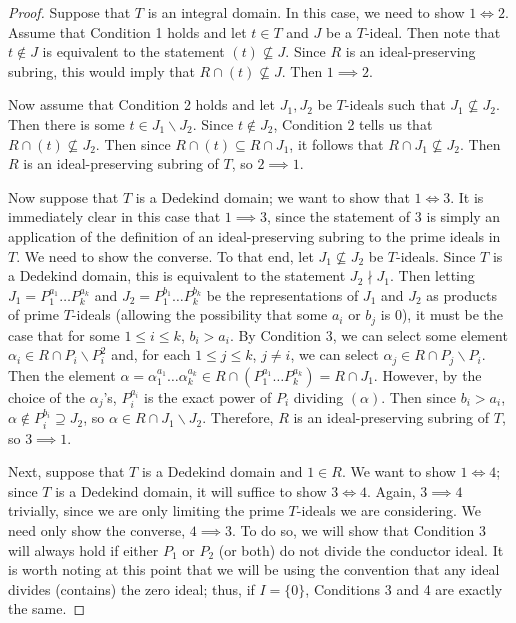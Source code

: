 \documentclass[10pt,a4paper]{amsart}
\begin{document}
	\begin{proof}
		Suppose that $T$ is an integral domain. In this case, we need to show $1\iff 2$. Assume that Condition 1 holds and let $t\in T$ and $J$ be a $T$-ideal. Then note that $t\notin J$ is equivalent to the statement $(t)\nsubseteq J$. Since $R$ is an ideal-preserving subring, this would imply that $R\cap (t)\nsubseteq J$. Then $1\implies 2$.
		
		Now assume that Condition 2 holds and let $J_1, J_2$ be $T$-ideals such that $J_1\nsubseteq J_2$. Then there is some $t\in J_1\backslash J_2$. Since $t\notin J_2$, Condition 2 tells us that $R\cap (t)\nsubseteq J_2$. Then since $R\cap (t)\subseteq R\cap J_1$, it follows that $R\cap J_1\nsubseteq J_2$. Then $R$ is an ideal-preserving subring of $T$, so $2\implies 1$.
		
		Now suppose that $T$ is a Dedekind domain; we want to show that $1\iff 3$. It is immediately clear in this case that $1\implies 3$, since the statement of $3$ is simply an application of the definition of an ideal-preserving subring to the prime ideals in $T$. We need to show the converse. To that end, let $J_1\nsubseteq J_2$ be $T$-ideals. Since $T$ is a Dedekind domain, this is equivalent to the statement $J_2\nmid J_1$. Then letting $J_1=P_1^{a_1}\dots P_k^{a_k}$ and $J_2=P_1^{b_1}\dots P_k^{b_k}$ be the representations of $J_1$ and $J_2$ as products of prime $T$-ideals (allowing the possibility that some $a_i$ or $b_j$ is 0), it must be the case that for some $1\leq i\leq k$, $b_i>a_i$. By Condition 3, we can select some element $\alpha_i\in R\cap P_i\backslash P_i^2$ and, for each $1\leq j\leq k$, $j\neq i$, we can select $\alpha_j\in R\cap P_j\backslash P_i$. Then the element $\alpha=\alpha_1^{a_1}\dots \alpha_k^{a_k}\in R\cap (P_1^{a_1}\dots P_k^{a_k})=R\cap J_1$. However, by the choice of the $\alpha_j$'s, $P_i^{a_i}$ is the exact power of $P_i$ dividing $(\alpha)$. Then since $b_i>a_i$, $\alpha\notin P_i^{b_i}\supseteq J_2$, so $\alpha\in R\cap J_1\backslash J_2$. Therefore, $R$ is an ideal-preserving subring of $T$, so $3\implies 1$.
		
		Next, suppose that $T$ is a Dedekind domain and $1\in R$. We want to show $1\iff 4$; since $T$ is a Dedekind domain, it will suffice to show $3\iff 4$. Again, $3\implies 4$ trivially, since we are only limiting the prime $T$-ideals we are considering. We need only show the converse, $4\implies 3$. To do so, we will show that Condition 3 will always hold if either $P_1$ or $P_2$ (or both) do not divide the conductor ideal. It is worth noting at this point that we will be using the convention that any ideal divides (contains) the zero ideal; thus, if $I=\{0\}$, Conditions 3 and 4 are exactly the same.
		

\end{proof}
\end{document}
